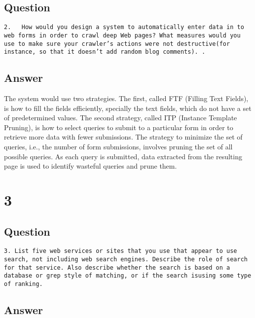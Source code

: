 \documentclass[letterpaper,11pt]{article}
\begin{document}
\subsection*{Question}

\begin{verbatim}
2.   How would you design a system to automatically enter data in to web forms in order to crawl deep Web pages? What measures would you use to make sure your crawler’s actions were not destructive(for instance, so that it doesn’t add random blog comments). .
\end{verbatim}

\subsection*{Answer}


The system would use two strategies. The first, called FTF (Filling Text Fields), is how to
fill the fields efficiently, specially the text fields, which do not have a set of predetermined
values. The second strategy, called ITP (Instance Template Pruning),
is how to select queries to submit to a particular form in order to retrieve
more data with fewer submissions. The strategy to minimize the set of queries,
i.e., the number of form submissions, involves pruning the set of all possible
queries. As each query is submitted, data extracted from the resulting page is
used to identify wasteful queries and prune them.
\clearpage


\section*{3}

\subsection*{Question}

\begin{verbatim}
3. List five web services or sites that you use that appear to use search, not including web search engines. Describe the role of search for that service. Also describe whether the search is based on a database or grep style of matching, or if the search isusing some type of ranking.
\end{verbatim}

\subsection*{Answer}
\end{document}

